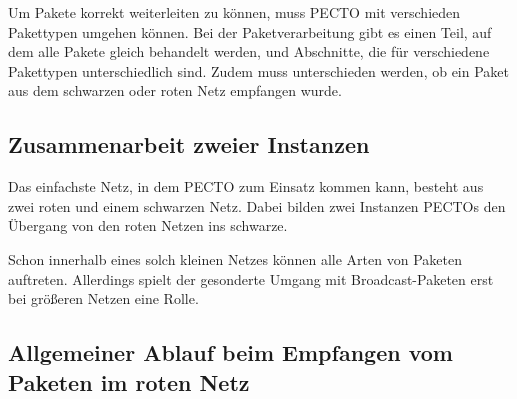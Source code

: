 \documentclass[a4paper, 11pt, ngerman, fleqn]{article}
\begin{document}
Um Pakete korrekt weiterleiten zu können, muss PECTO mit verschieden Pakettypen umgehen können. 
Bei der Paketverarbeitung gibt es einen Teil, auf dem alle Pakete gleich behandelt werden, und Abschnitte, die für verschiedene Pakettypen unterschiedlich sind.
Zudem muss unterschieden werden, ob ein Paket aus dem schwarzen oder roten Netz empfangen wurde.

\subsection{Zusammenarbeit zweier Instanzen}
Das einfachste Netz, in dem PECTO zum Einsatz kommen kann, besteht aus zwei roten und einem schwarzen Netz.
Dabei bilden zwei Instanzen PECTOs den Übergang von den roten Netzen ins schwarze.

Schon innerhalb eines solch kleinen Netzes können alle Arten von Paketen auftreten.
Allerdings spielt der gesonderte Umgang mit Broadcast-Paketen erst bei größeren Netzen eine Rolle.

\subsection{Allgemeiner Ablauf beim Empfangen vom Paketen im roten Netz}
\end{document}
